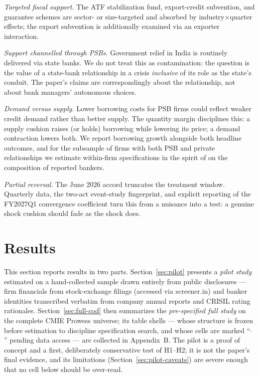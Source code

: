 \documentclass[12pt]{article}
\begin{document}
\emph{Targeted fiscal support.} The ATF stabilization fund, export-credit subvention, and guarantee
schemes are sector- or size-targeted and absorbed by industry$\times$quarter effects; the
export subvention is additionally examined via an exporter interaction.

\emph{Support channelled through PSBs.} Government relief in India is routinely delivered
via state banks. We do not treat this as contamination: the question is the value of a
state-bank relationship in a crisis \emph{inclusive} of its role as the state's conduit.
The paper's claims are correspondingly about the relationship, not about bank managers'
autonomous choices.

\emph{Demand versus supply.} Lower borrowing costs for PSB firms could reflect weaker
credit demand rather than better supply. The quantity margin disciplines this: a supply
cushion raises (or holds) borrowing while lowering its price; a demand contraction lowers
both. We report borrowing growth alongside both headline outcomes, and for the subsample
of firms with both PSB and private relationships we estimate within-firm specifications in
the spirit of \citet{khwaja2008} on the composition of reported bankers.

\emph{Partial reversal.} The June 2026 accord truncates the treatment window. Quarterly
data, the two-act event-study fingerprint, and explicit reporting of the FY2027Q1
convergence coefficient turn this from a nuisance into a test: a genuine shock cushion
should fade as the shock does.

\section{Results}\label{sec:results}

This section reports results in two parts. Section~\ref{sec:pilot} presents a \emph{pilot
study} estimated on a hand-collected sample drawn entirely from public disclosures ---
firm financials from stock-exchange filings (accessed via screener.in) and banker
identities transcribed verbatim from company annual reports and CRISIL rating rationales.
Section~\ref{sec:full-cod} then summarizes the \emph{pre-specified full study} on the
complete CMIE Prowess universe; its table shells --- whose structure is frozen before
estimation to discipline specification search, and whose cells are marked ``$\cdot$''
pending data access --- are collected in Appendix~B. The pilot is a proof of concept and a
first, deliberately conservative test of H1--H2; it is not the paper's final evidence, and
its limitations (Section~\ref{sec:pilot-caveats}) are severe enough that no cell below
should be over-read.
\end{document}
